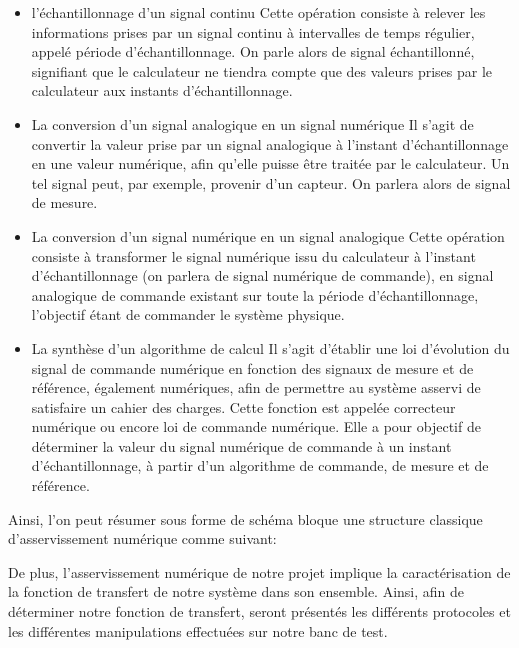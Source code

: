 \documentclass[french,a4paper,12pt]{report}
\begin{document}
	\begin{itemize}
		\item l'échantillonnage d'un signal continu
			Cette opération consiste à relever les informations prises par un signal continu à intervalles de temps
			régulier, appelé période d'échantillonnage. On parle alors de signal échantillonné, signifiant que le
			calculateur ne tiendra compte que des valeurs prises par le calculateur aux instants d'échantillonnage.
			
		\item La conversion d'un signal analogique en un signal numérique
			Il s'agit de convertir la valeur prise par un signal analogique à l'instant d'échantillonnage en une
			valeur numérique, afin qu'elle puisse être traitée par le calculateur. Un tel signal peut, par exemple, 
			provenir d'un capteur. On parlera alors de signal de mesure.
			 
		\item La conversion d'un signal numérique en un signal analogique
			Cette opération consiste à transformer le signal numérique issu du calculateur à l'instant 
			d'échantillonnage (on parlera de signal numérique de commande), en signal analogique de commande 
			existant sur toute la période d'échantillonnage, l'objectif étant de commander le système physique.
			
		\item  La synthèse d'un algorithme de calcul
			Il s'agit d'établir une loi d'évolution du signal de commande numérique en fonction des signaux de mesure
			et de référence, également numériques, afin de permettre au système asservi de satisfaire un cahier des
			charges. Cette fonction est appelée correcteur numérique ou encore loi de commande numérique. Elle a pour
			objectif de déterminer la valeur du signal numérique de commande à un instant d'échantillonnage, à partir 
			d'un algorithme de commande, de mesure et de référence.
	\end{itemize}
	
	Ainsi, l'on peut résumer sous forme de schéma bloque une structure classique d'asservissement numérique comme suivant:
	
	
	De plus, l'asservissement numérique de notre projet implique la caractérisation de la fonction de transfert de notre système dans son ensemble.
	Ainsi, afin de déterminer notre fonction de transfert, seront présentés les différents protocoles et les différentes manipulations effectuées sur notre banc de test.
\end{document}
